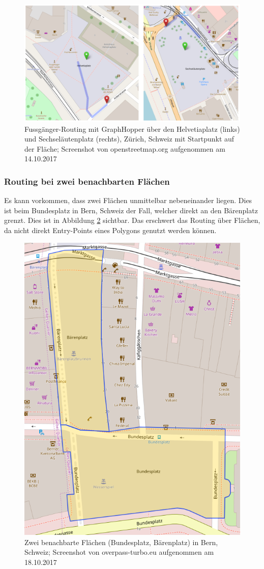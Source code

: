 \begin{figure}[ht]
    \centering
    \includegraphics[width=1\linewidth]{technicalreport/img/start_endpoint_on_area}
    \caption[Fussgänger-Routing mit Startpunkt auf der Fläche]{Fussgänger-Routing mit GraphHopper über den Helvetiaplatz (links) und Sechseläutenplatz (rechts), Zürich, Schweiz mit Startpunkt auf der Fläche; Screenshot von openstreetmap.org aufgenommen am 14.10.2017}
    \label{fig:start_endpoint_on_area}
\end{figure}

\subsubsection{Routing bei zwei benachbarten Flächen}
\label{problem:Routing bei zwei benachbarten Flächen}
Es kann vorkommen, dass zwei Flächen unmittelbar nebeneinander liegen. Dies ist beim Bundesplatz in Bern, Schweiz der Fall, welcher direkt an den Bärenplatz grenzt. Dies ist in Abbildung \ref{fig:bundesplatz_baerenplatz} sichtbar. Das erschwert das Routing über Flächen, da nicht direkt Entry-Points eines Polygons genutzt werden können.

\begin{figure}[ht]
\centering
\includegraphics[width=0.5\linewidth]{technicalreport/img/bundesplatz_baerenplatz}
\caption[Zwei benachbarte Flächen]{Zwei benachbarte Flächen (Bundesplatz, Bärenplatz) in Bern, Schweiz; Screenshot von overpass-turbo.eu aufgenommen am 18.10.2017}
\label{fig:bundesplatz_baerenplatz}
\end{figure}
	
